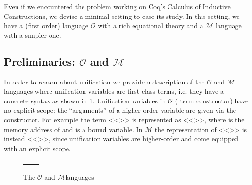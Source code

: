 \documentclass[sigconf,natbib=false,review]{acmart}
\newcommand{\llambda}{\ensuremath{\mathcal{L}}\xspace}
\newcommand{\Fo}{\texorpdfstring{\ensuremath{\mathcal{O}}\xspace}{O}}
\newcommand{\Ho}{\texorpdfstring{\ensuremath{\mathcal{M}}\xspace}{M}}
\begin{document}
\newcommand{\maybeeta}{\texorpdfstring{\ensuremath{\Diamond\eta}\xspace}{maybeeta}}
\newcommand{\maybebeta}{\texorpdfstring{\ensuremath{\Diamond\beta}\xspace}{maybebeta}}
\newcommand{\notllambda}{\texorpdfstring{\ensuremath{\Diamond\llambda}\xspace}{maybellam}}

Even if we encountered the problem working on Coq's Calculus of Inductive
Constructions, we devise
a minimal setting to ease its study. In this setting, we have
a (first order) language \Fo{} with a rich equational
theory and a \Ho{} language with a simpler one.


\subsection{Preliminaries: \Fo{} and \Ho{}}

In order to reason about unification we provide a description of the
\Fo{} and \Ho languages where unification variables
are first-class terms, i.e. they have a concrete syntax as
shown in \cref{code:common-terms}.
Unification variables
in \Fo{} ( term constructor) have no explicit scope:
the ``arguments'' of a higher-order variable are given via the 
constructor. For example the term <<>> is represented as
<<>>, where  is the memory address
of  and  is a bound variable.
In \Ho{} the representation of <<>> is instead <<>>,
since unification variables are higher-order and come equipped with an
explicit scope.
%
%
{
\setlength{\abovecaptionskip}{0pt}
\setlength{\belowcaptionskip}{-13pt}
\begin{figure}[b] %
  \begin{tabular}{ll}
  \begin{minipage}{0.21\textwidth}
   {code/fo_tm}
  \end{minipage}
  &
  \begin{minipage}{0.24\textwidth}
   {code/ho_tm}
  \end{minipage}
  \end{tabular}\vspace{4pt}
  \caption{The \Fo{} and \Ho languages}\vspace{0.3em}
  \label{code:common-terms}
\end{figure}
}
%
\end{document}
